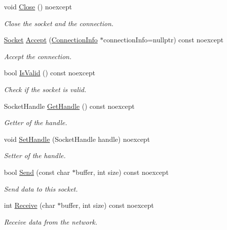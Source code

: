 \begin{DoxyCompactItemize}
\mbox{\label{class_blade_1_1_socket_a5806bdcd320ec474de73347f53ccf4f0}} 
void \hyperlink{class_blade_1_1_socket_a5806bdcd320ec474de73347f53ccf4f0}{Close} () noexcept
\begin{DoxyCompactList}\small\item\em Close the socket and the connection. \end{DoxyCompactList}\item 
\hyperlink{class_blade_1_1_socket}{Socket} \hyperlink{class_blade_1_1_socket_aafaf8dc48b92aec2f7b9589077838859}{Accept} (\hyperlink{struct_blade_1_1_connection_info}{Connection\+Info} $\ast$connection\+Info=nullptr) const noexcept
\begin{DoxyCompactList}\small\item\em Accept the connection. \end{DoxyCompactList}\item 
bool \hyperlink{class_blade_1_1_socket_ac459be555495e99117c4a98a50e2f92b}{Is\+Valid} () const noexcept
\begin{DoxyCompactList}\small\item\em Check if the socket is valid. \end{DoxyCompactList}\item 
Socket\+Handle \hyperlink{class_blade_1_1_socket_a1af1996fc8de7ba17106903560d45efb}{Get\+Handle} () const noexcept
\begin{DoxyCompactList}\small\item\em Getter of the handle. \end{DoxyCompactList}\item 
void \hyperlink{class_blade_1_1_socket_adb437f4e6ee09e6bcaf6b48d536e504e}{Set\+Handle} (Socket\+Handle handle) noexcept
\begin{DoxyCompactList}\small\item\em Setter of the handle. \end{DoxyCompactList}\item 
bool \hyperlink{class_blade_1_1_socket_a619058cf7a937e45aa0d4e50971bde24}{Send} (const char $\ast$buffer, int size) const noexcept
\begin{DoxyCompactList}\small\item\em Send data to this socket. \end{DoxyCompactList}\item 
int \hyperlink{class_blade_1_1_socket_ab6e77d46652d77508f6fdd1c5d3161ba}{Receive} (char $\ast$buffer, int size) const noexcept
\begin{DoxyCompactList}\small\item\em Receive data from the network. \end{DoxyCompactList}\end{DoxyCompactItemize}


